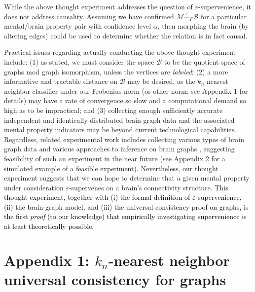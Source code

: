 \documentclass[10pt]{article}
\newcommand{\mB}{\mathcal{B}}
\newcommand{\mM}{\mathcal{M}}
\newcommand{\MeB}{\mM \overset{\varepsilon}{{\sim}}_F \mB}
\providecommand{\tr}[1]{\textcolor{black}{#1}}
\begin{document}
While the above thought experiment addresses the question of $\varepsilon$-supervenience, it does not address causality. Assuming we have confirmed $\MeB$ for a particular mental/brain property pair with confidence level $\alpha$, then morphing the brain (by altering edges) could be used to determine whether the relation is in fact causal.

Practical issues regarding actually conducting the above thought experiment include: (1) as stated, we must consider the space $\mB$ to be the quotient space of graphs mod graph isomorphism, unless the vertices are {\it labeled}; (2) a more informative and tractable distance on $\mB$ may be desired, as the $k_n$-nearest neighbor classifier under our Frobenius norm (or other norm; see Appendix 1 for details) may have a rate of convergence so slow and a computational demand so high as to be impractical; and (3) collecting enough sufficiently accurate independent and identically distributed brain-graph data and the associated mental property indicators may be beyond current technological capabilities. Regardless, related experimental work includes collecting various types of brain graph data \cite{WhiteBrenner86, DenkHorstmann04, BriggmanDenk06} and various approaches to inference on brain graphs \cite{MackeBorst08, Mishchenko09, LuLichtman09}, suggesting feasibility of such an experiment in the near future (see Appendix 2 for a simulated example of a feasible experiment). Nevertheless, our thought experiment suggests that we can hope to determine that a given mental property under consideration $\varepsilon$-supervenes on a brain's connectivity structure. \tr{This thought experiment, together with (i) the formal definition of $\varepsilon$-supervenience, (ii) the brain-graph model, and (iii) the universal consistency proof on graphs, is the first \emph{proof} (to our knowledge) that empirically investigating supervenience is at least theoretically possible.}




\section*{Appendix 1: $k_n$-nearest neighbor universal consistency for graphs}
\label{proof}
\end{document}
